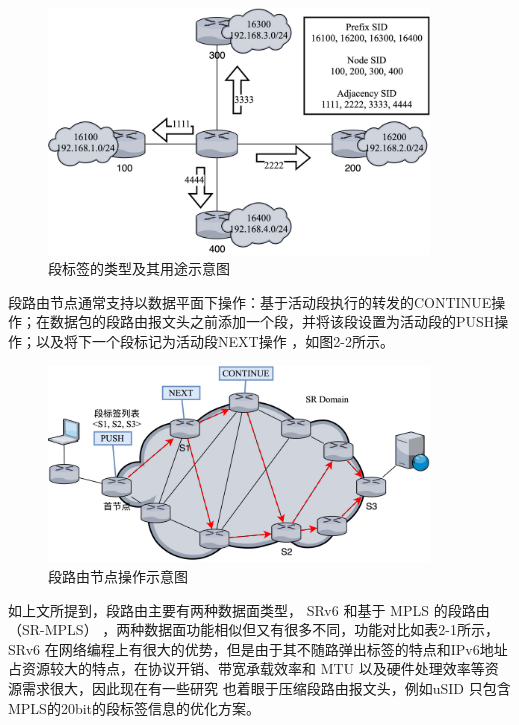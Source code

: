 \begin{figure}[htbp]
\setlength{\abovecaptionskip}{15pt plus 3pt minus 2pt}
\centerline{\includegraphics[width=0.9\textwidth]{./figures/ch2-kinds-of-SID.png}}
\caption{段标签的类型及其用途示意图}
\label{fig-ch2-kinds-of-SID}
\end{figure}

段路由节点通常支持以数据平面下操作：基于活动段执行的转发的CONTINUE操作；在数据包的段路由报文头之前添加一个段，并将该段设置为活动段的PUSH操作；以及将下一个段标记为活动段NEXT操作 \cite{SRARK} ，如图2-2所示。

\begin{figure}[htbp]
\setlength{\abovecaptionskip}{15pt plus 3pt minus 2pt}
\centerline{\includegraphics[width=0.9\textwidth]{./figures/ch2-SR-actions.png}}
\caption{段路由节点操作示意图}
\label{fig-ch2-SR-actions}
\end{figure}

如上文所提到，段路由主要有两种数据面类型， \gls*{SRv6} 和基于 \gls*{MPLS} 的段路由（SR-MPLS）\cite{SRMPLS}  ，两种数据面功能相似但又有很多不同，功能对比如表2-1所示， \gls*{SRv6} 在网络编程上有很大的优势，但是由于其不随路弹出标签的特点和IPv6地址占资源较大的特点，在协议开销、带宽承载效率和 \gls*{MTU} 以及硬件处理效率等资源需求很大，因此现在有一些研究 \cite{GSID} \cite{MICROSID} \cite{USID} 也着眼于压缩段路由报文头，例如uSID \cite{USID} 只包含MPLS的20bit的段标签信息的优化方案。


